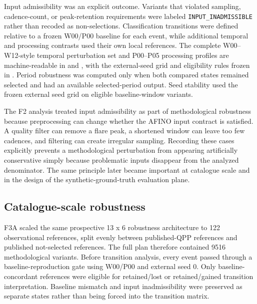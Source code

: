 \documentclass[manuscript,linenumbers]{aastex702}
\begin{document}
Input admissibility was an explicit outcome. Variants that violated sampling, cadence-count, or peak-retention requirements were labeled \texttt{INPUT\_INADMISSIBLE} rather than recoded as non-selections. Classification transitions were defined relative to a frozen W00/P00 baseline for each event, while additional temporal and processing contrasts used their own local references. The complete W00--W12-style temporal perturbation set and P00--P05 processing profiles are machine-readable in  and , with the external-seed grid and eligibility rules frozen in . Period robustness was computed only when both compared states remained selected and had an available selected-period output. Seed stability used the frozen external seed grid on eligible baseline-window variants.

The F2 analysis treated input admissibility as part of methodological robustness because preprocessing can change whether the AFINO input contract is satisfied. A quality filter can remove a flare peak, a shortened window can leave too few cadences, and filtering can create irregular sampling. Recording these cases explicitly prevents a methodological perturbation from appearing artificially conservative simply because problematic inputs disappear from the analyzed denominator. The same principle later became important at catalogue scale and in the design of the synthetic-ground-truth evaluation plane.

\subsection{Catalogue-scale robustness}
F3A scaled the same prospective 13 x 6 robustness architecture to 122 observational references, split evenly between published-QPP references and published not-selected references. The full plan therefore contained 9516 methodological variants. Before transition analysis, every event passed through a baseline-reproduction gate using W00/P00 and external seed 0. Only baseline-concordant references were eligible for retained/lost or retained/gained transition interpretation. Baseline mismatch and input inadmissibility were preserved as separate states rather than being forced into the transition matrix.
\end{document}
